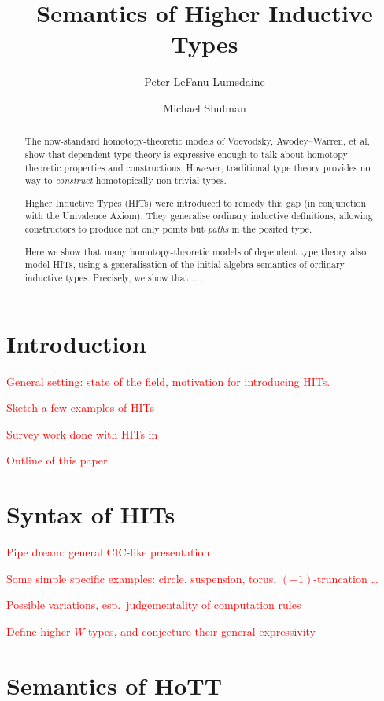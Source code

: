 \documentclass{amsart}
\title{Semantics of Higher Inductive Types}
\author{Peter LeFanu Lumsdaine}
\author{Michael Shulman}
\newcommand{\todo}[1]{\textcolor{red}{#1}}
\begin{document}
\maketitle

\begin{abstract}
The now-standard homotopy-theoretic models of Voevodsky, Awodey--Warren, et al, show that dependent type theory is expressive enough to talk about homotopy-theoretic properties and constructions.
%
However, traditional type theory provides no way to \emph{construct} homotopically non-trivial types.

Higher Inductive Types (HITs) were introduced to remedy this gap (in conjunction with the Univalence Axiom).
%
They generalise ordinary inductive definitions, allowing constructors to produce not only points but \emph{paths} in the posited type.

Here we show that many homotopy-theoretic models of dependent type theory also model HITs, using a generalisation of the initial-algebra semantics of ordinary inductive types.
%
Precisely, we show that \todo{\ldots} .
\end{abstract}


\tableofcontents

\section{Introduction}

\todo{General setting: state of the field, motivation for introducing HITs.}

\todo{Sketch a few examples of HITs}

\todo{Survey work done with HITs in \cite{hott:book}}

\todo{Outline of this paper}

\section{Syntax of HITs}

\todo{Pipe dream: general CIC-like presentation}

\todo{Some simple specific examples: circle, suspension, torus, $(-1)$-truncation \ldots}

\todo{Possible variations, esp.\ judgementality of computation rules}

\todo{Define higher $W$-types, and conjecture their general expressivity}

\section{Semantics of HoTT}
\end{document}
